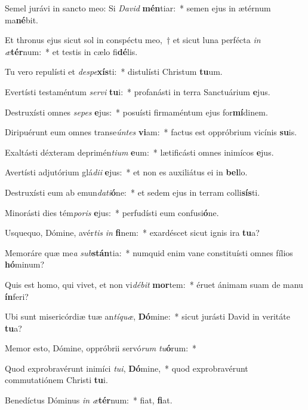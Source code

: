 \item Semel jurávi in sancto meo: Si \textit{Da}\textit{vid} \textbf{mén}tiar:~* semen ejus in ætérnum ma\textbf{né}bit.
\item Et thronus ejus sicut sol in conspéctu meo,~† et sicut luna perfécta \textit{in} \textit{æ}\textbf{tér}num:~* et testis in cælo fi\textbf{dé}lis.
\item Tu vero repulísti et \textit{de}\textit{spe}\textbf{xís}ti:~* distulísti Christum \textbf{tu}um.
\item Evertísti testaméntum \textit{ser}\textit{vi} \textbf{tu}i:~* profanásti in terra Sanctuárium \textbf{e}jus.
\item Destruxísti omnes \textit{se}\textit{pes} \textbf{e}jus:~* posuísti firmaméntum ejus for\textbf{mí}dinem.
\item Diripuérunt eum omnes transe\textit{ún}\textit{tes} \textbf{vi}am:~* factus est oppróbrium vicínis \textbf{su}is.
\item Exaltásti déxteram deprimén\textit{ti}\textit{um} \textbf{e}um:~* lætificásti omnes inimícos \textbf{e}jus.
\item Avertísti adjutórium glá\textit{di}\textit{i} \textbf{e}jus:~* et non es auxiliátus ei in \textbf{bel}lo.
\item Destruxísti eum ab emun\textit{da}\textit{ti}\textbf{ó}ne:~* et sedem ejus in terram colli\textbf{sís}ti.
\item Minorásti dies tém\textit{po}\textit{ris} \textbf{e}jus:~* perfudísti eum confusi\textbf{ó}ne.
\item Usquequo, Dómine, avér\textit{tis} \textit{in} \textbf{fi}nem:~* exardéscet sicut ignis ira \textbf{tu}a?
\item Memoráre quæ me\textit{a} \textit{sub}\textbf{stán}tia:~* numquid enim vane constituísti omnes fílios \textbf{hó}minum?
\item Quis est homo, qui vivet, et non vi\textit{dé}\textit{bit} \textbf{mor}tem:~* éruet ánimam suam de manu \textbf{ín}feri?
\item Ubi sunt misericórdiæ tuæ an\textit{tí}\textit{quæ}, \textbf{Dó}mine:~* sicut jurásti David in veritáte \textbf{tu}a?
\item Memor esto, Dómine, oppróbrii servó\textit{rum} \textit{tu}\textbf{ó}rum:~* 
\item Quod exprobravérunt inimíci \textit{tu}\textit{i}, \textbf{Dó}mine,~* quod exprobravérunt commutatiónem Christi \textbf{tu}i.
\item Benedíctus Dóminus \textit{in} \textit{æ}\textbf{tér}num:~* fiat, \textbf{fi}at.
